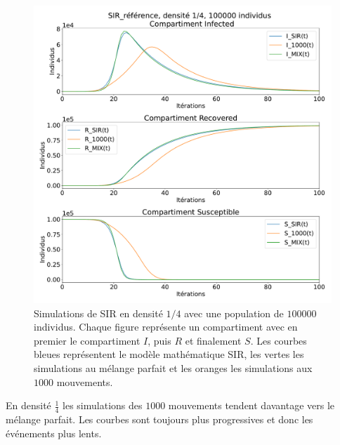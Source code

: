 \begin{figure}[h]
	\centering
	\captionsetup{justification=centering}
	\includegraphics[width=.8\textwidth]{Images/SIR_ref_4_100.pdf}
	\caption[Simulation SIR, densité $1/4$]{Simulations de SIR en densité $1/4$ avec une population de $100000$ individus. Chaque figure représente un compartiment avec en premier le compartiment $I$, puis $R$ et finalement $S$. Les courbes bleues représentent le modèle mathématique SIR, les vertes les simulations au mélange parfait et les oranges les simulations aux $1000$ mouvements.}
\end{figure}

En densité $\frac{1}{4}$ les simulations des $1000$ mouvements tendent davantage vers le mélange parfait. Les courbes sont toujours plus progressives et donc les événements plus lents.

\newpage

